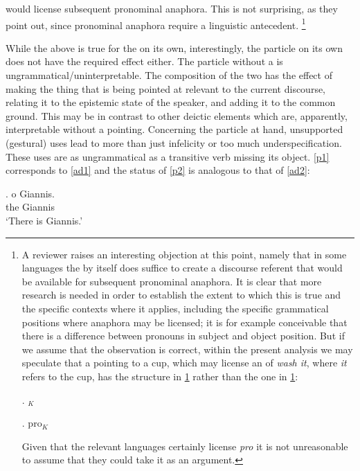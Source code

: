 \documentclass[output=paper]{LSP/langsci}
\begin{document}
would license subsequent pronominal anaphora.  This is not surprising,
as they point out, since pronominal anaphora require a linguistic
antecedent. \footnote{A reviewer raises an interesting objection at
  this point, namely that in some  languages the  by
  itself does suffice to create a discourse referent that would be
  available for subsequent pronominal anaphora.  It is clear that more
  research is needed in order to establish the extent to which this is
  true and the specific contexts where it applies, including the
  specific grammatical positions where anaphora may be licensed; it is
  for example conceivable that there is a difference between pronouns
  in subject and object position. But if we assume that the
  observation is correct, within the present analysis we may speculate
  that a pointing to a cup, which may license an  of
  \textit{wash it}, where \textit{it} refers to the cup, has the
  structure in \ref{cof2} rather than the one in \ref{cof1}:

  
  \Lsciex. \label{cof1} \xspace\Pointinghand   \Coffeecup$_{K}$ 
  

   \Lsciex. \label{cof2} \xspace\Pointinghand   pro$_{K}$


 Given that the relevant languages certainly license \textit{pro} it is not unreasonable to assume that they could take it as an argument. }
  
While the above is true for the  on its own, interestingly, the particle on its own does not have the required  effect either.  The particle without a  is ungrammatical/uninterpretable.  The composition of the two has the effect of making the thing that is being pointed at relevant to the current discourse, relating it to the epistemic state of the speaker, and adding it to the common ground.  This may be in contrast to other deictic elements which are, apparently, interpretable without a pointing.  Concerning the particle at hand, unsupported (gestural) uses lead to more than just infelicity or too much underspecification.  These uses are as ungrammatical as a transitive verb missing its object. \ref{p1} corresponds to \ref{ad1} and the status of \ref{p2} is analogous to that of \ref{ad2}:


\exg. 
\na \xspace\Pointinghand o Giannis.\\
\na \xspace\Pointinghand the Giannis\\ \label{p1}
\glt `There is Giannis.'
\end{document}
